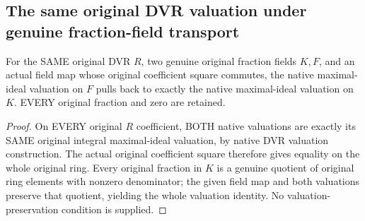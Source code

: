 \subsection{The same original DVR valuation under genuine fraction-field transport}

\begin{lemma}
\label{lem:actual-dvr-fraction-valuation-transport}
\leanok
For the SAME original DVR $R$, two genuine original fraction fields $K,F$,
and an actual field map whose original coefficient square commutes, the native
maximal-ideal valuation on $F$ pulls back to exactly the native maximal-ideal
valuation on $K$. EVERY original fraction and zero are retained.
\end{lemma}
\begin{proof}
On EVERY original $R$ coefficient, BOTH native valuations are exactly its
SAME original integral maximal-ideal valuation, by native DVR valuation
construction. The actual original coefficient square therefore gives equality
on the whole original ring. Every original fraction in $K$ is a genuine
quotient of original ring elements with nonzero denominator; the given field
map and both valuations preserve that quotient, yielding the whole valuation
identity. No valuation-preservation condition is supplied.
\end{proof}
